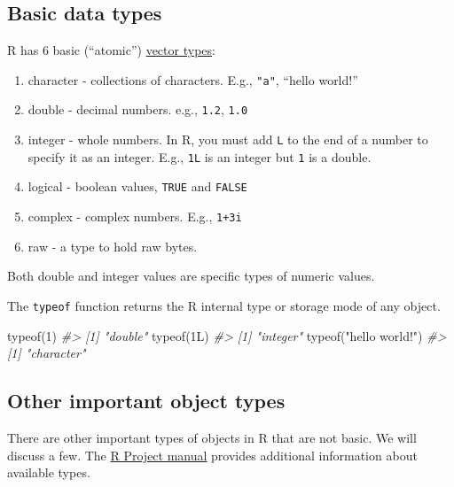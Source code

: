 \documentclass[
]{article}
\newenvironment{Shaded}{\begin{snugshade}}{\end{snugshade}}
\newcommand{\CommentTok}[1]{\textcolor[rgb]{0.56,0.35,0.01}{\textit{#1}}}
\newcommand{\DecValTok}[1]{\textcolor[rgb]{0.00,0.00,0.81}{#1}}
\newcommand{\FunctionTok}[1]{\textcolor[rgb]{0.00,0.00,0.00}{#1}}
\newcommand{\NormalTok}[1]{#1}
\newcommand{\StringTok}[1]{\textcolor[rgb]{0.31,0.60,0.02}{#1}}
\providecommand{\tightlist}{%
  \setlength{\itemsep}{0pt}\setlength{\parskip}{0pt}}
\begin{document}
\hypertarget{basic-data-types}{%
\subsection{Basic data types}\label{basic-data-types}}

R has 6 basic (``atomic'')
\href{https://cran.r-project.org/doc/manuals/r-release/R-lang.html\#Basic-types}{vector
types}:

\begin{enumerate}
\def\labelenumi{\arabic{enumi}.}
\tightlist
\item
  character - collections of characters. E.g., \texttt{"a"}, ``hello
  world!''
\item
  double - decimal numbers. e.g., \texttt{1.2}, \texttt{1.0}
\item
  integer - whole numbers. In R, you must add \texttt{L} to the end of a
  number to specify it as an integer. E.g., \texttt{1L} is an integer
  but \texttt{1} is a double.
\item
  logical - boolean values, \texttt{TRUE} and \texttt{FALSE}
\item
  complex - complex numbers. E.g., \texttt{1+3i}
\item
  raw - a type to hold raw bytes.
\end{enumerate}

Both double and integer values are specific types of numeric values.

The \texttt{typeof} function returns the R internal type or storage mode
of any object.

\begin{Shaded}
\begin{Highlighting}[]
\FunctionTok{typeof}\NormalTok{(}\DecValTok{1}\NormalTok{)}
\CommentTok{\#\textgreater{} [1] "double"}
\FunctionTok{typeof}\NormalTok{(1L)}
\CommentTok{\#\textgreater{} [1] "integer"}
\FunctionTok{typeof}\NormalTok{(}\StringTok{"hello world!"}\NormalTok{)}
\CommentTok{\#\textgreater{} [1] "character"}
\end{Highlighting}
\end{Shaded}

\hypertarget{other-important-object-types}{%
\subsection{Other important object
types}\label{other-important-object-types}}

There are other important types of objects in R that are not basic. We
will discuss a few. The
\href{https://cran.r-project.org/doc/manuals/r-release/R-lang.html\#Basic-types}{R
Project manual} provides additional information about available types.
\end{document}
